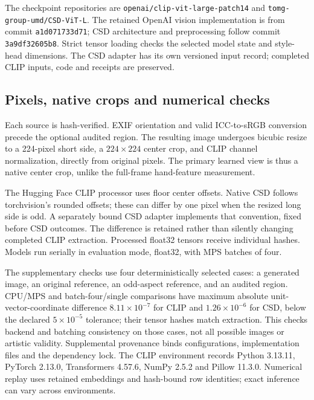 The checkpoint repositories are \texttt{openai/clip-vit-large-patch14} and
\texttt{tomg-group-umd/CSD-ViT-L}. The retained OpenAI vision implementation is
from commit \texttt{a1d071733d71}; CSD architecture and preprocessing follow
commit \texttt{3a9df32605b8}. Strict tensor loading checks the selected model
state and style-head dimensions. The CSD adapter has its own versioned input
record; completed CLIP inputs, code and receipts are preserved.

\subsection{Pixels, native crops and numerical checks}
Each source is hash-verified. EXIF orientation and valid ICC-to-sRGB conversion
precede the optional audited region. The resulting image undergoes bicubic resize
to a 224-pixel short side, a $224\times224$ center crop, and CLIP channel
normalization, directly from original pixels. The primary learned view is thus a
native center crop, unlike the full-frame hand-feature measurement.

The Hugging Face CLIP processor uses floor center offsets. Native CSD follows
torchvision's rounded offsets; these can differ by one pixel when the resized
long side is odd. A separately bound CSD adapter implements that convention,
fixed before CSD outcomes. The difference is retained rather than silently
changing completed CLIP extraction. Processed float32 tensors receive individual
hashes. Models run serially in evaluation mode, float32, with MPS batches of four.

The supplementary checks use four deterministically selected cases: a
generated image, an original reference, an odd-aspect reference, and an audited
region. CPU/MPS and batch-four/single comparisons have maximum absolute
unit-vector-coordinate difference $8.11\times10^{-7}$ for CLIP and
$1.26\times10^{-6}$ for CSD, below the declared
$5\times10^{-5}$ tolerance; their tensor hashes match extraction. This checks
backend and batching consistency on those cases, not all possible images or
artistic validity. Supplemental provenance binds configurations, implementation
files and the dependency lock. The CLIP environment records Python 3.13.11,
PyTorch 2.13.0, Transformers 4.57.6, NumPy 2.5.2 and Pillow 11.3.0. Numerical
replay uses retained embeddings and hash-bound row identities; exact inference
can vary across environments.

